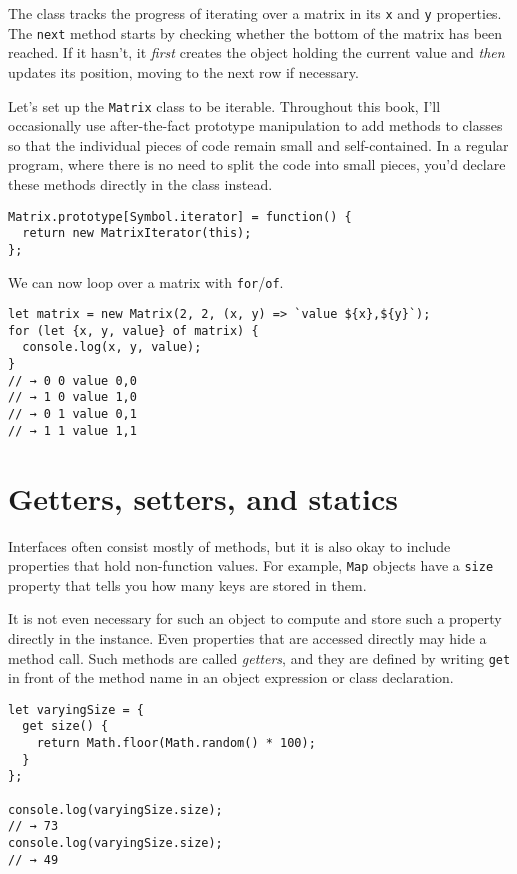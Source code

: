 The class tracks the progress of iterating over a matrix in its \lstinline`x` and \lstinline`y` properties. The \lstinline`next` method starts by checking whether the bottom of the matrix has been reached. If it hasn't, it \emph{first} creates the object holding the current value and \emph{then} updates its position, moving to the next row if necessary.

Let's set up the \lstinline`Matrix` class to be iterable. Throughout this book, I'll occasionally use after-the-fact prototype manipulation to add methods to classes so that the individual pieces of code remain small and self-contained. In a regular program, where there is no need to split the code into small pieces, you'd declare these methods directly in the class instead.

\begin{lstlisting}
Matrix.prototype[Symbol.iterator] = function() {
  return new MatrixIterator(this);
};
\end{lstlisting}
\noindent{}

We can now loop over a matrix with \lstinline`for`/\lstinline`of`.

\begin{lstlisting}
let matrix = new Matrix(2, 2, (x, y) => `value ${x},${y}`);
for (let {x, y, value} of matrix) {
  console.log(x, y, value);
}
// → 0 0 value 0,0
// → 1 0 value 1,0
// → 0 1 value 0,1
// → 1 1 value 1,1
\end{lstlisting}
\noindent

\section{Getters, setters, and statics}

Interfaces often consist mostly of methods, but it is also okay to include properties that hold non-function values. For example, \lstinline`Map` objects have a \lstinline`size` property that tells you how many keys are stored in them.

It is not even necessary for such an object to compute and store such a property directly in the instance. Even properties that are accessed directly may hide a method call. Such methods are called \emph{getters}, and they are defined by writing \lstinline`get` in front of the method name in an object expression or class declaration.

\begin{lstlisting}
let varyingSize = {
  get size() {
    return Math.floor(Math.random() * 100);
  }
};

console.log(varyingSize.size);
// → 73
console.log(varyingSize.size);
// → 49
\end{lstlisting}
\noindent{}

